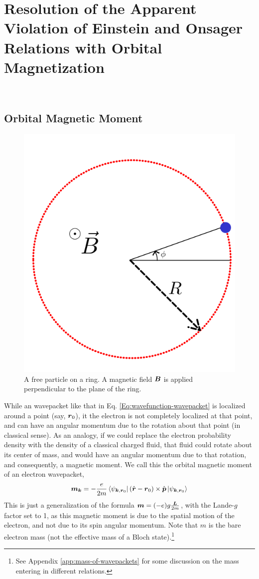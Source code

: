\documentclass{report}
\renewcommand\vec[1]{\ensuremath\boldsymbol{#1}} %
\begin{document}
\chapter{Resolution of the Apparent Violation of Einstein and Onsager Relations with Orbital Magnetization}~\label{chap:OrbMag}

\section{Orbital Magnetic Moment} \label{sec:OrbMagMom}
\begin{figure}
	\centering
	\includegraphics[width=0.3\linewidth]{particle-on-a-ring}
	\caption{A free particle on a ring. A magnetic field $\vec{B}$ is applied perpendicular to the plane of the ring.}
	\label{fig:particle-on-a-ring}
\end{figure}
While an wavepacket like that in Eq. \eqref{Eq:wavefunction-wavepacket} is localized around a point (say, $\vec{r}_0$), it the electron is not completely localized at that point, and can have an angular momentum due to the rotation about that point (in classical sense). As an analogy, if we could replace the electron probability density with the density of a classical charged fluid, that fluid could rotate about its center of mass, and would have an angular momentum due to that rotation, and consequently, a magnetic moment. We call this the orbital magnetic moment of an electron wavepacket,
\begin{equation}\label{Eq:OrbitalMagneticMomentExpression}
	\vec{m}_{\vec{k}} = -\frac{e}{2 m} \bra{\psi_{\vec{k}, \vec{r}_0}}(\hat{\vec{r}} - \vec{r}_0)\times\hat{\vec{p}}\ket{\psi_{\vec{k}, \vec{r}_0}}
\end{equation}
This is just a generalization of the formula $\vec{m} = (-e)g \frac{\vec{L}}{2 m}$, with the Lande-$g$ factor set to 1, as this magnetic moment is due to the spatial motion of the electron, and not due to its spin angular momentum.
Note that $m$ is the bare electron mass (not the effective mass of a Bloch state).\footnote{See Appendix \ref{app:mass-of-wavepackets} for some discussion on the mass entering in different relations.}
\end{document}
